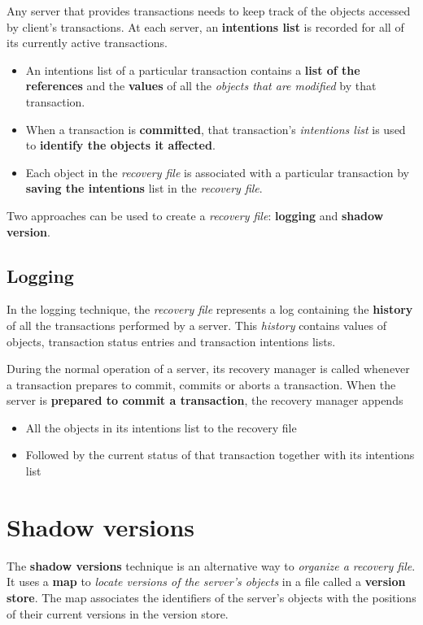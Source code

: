 Any server that provides transactions needs to keep track of the objects accessed by client's transactions. At each server, an \textbf{intentions list} is recorded for all of its currently active transactions.
\begin{itemize}
    \item An intentions list of a particular transaction contains a \textbf{list of the references} and the \textbf{values} of all the \textit{objects that are modified} by that transaction.
    \item When a transaction is \textbf{committed}, that transaction’s \textit{intentions list} is used to \textbf{identify the objects it affected}.
    \item Each object in the \textit{recovery file} is associated with a particular transaction by \textbf{saving the intentions} list in the \textit{recovery file}.
\end{itemize}
Two approaches can be used to create a \textit{recovery file}: \textbf{logging} and \textbf{shadow version}.

\subsection{Logging}
In the logging technique, the \textit{recovery file} represents a log containing the \textbf{history} of all the transactions performed by a server. This \textit{history} contains values of objects, transaction status entries and transaction intentions lists.

During the normal operation of a server, its recovery manager is called whenever a transaction prepares to commit, commits or aborts a transaction. When the server is \textbf{prepared to commit a transaction}, the recovery manager appends
\begin{itemize}
    \item All the objects in its intentions list to the recovery file
    \item Followed by the current status of that transaction together with its intentions list
\end{itemize}


\section{Shadow versions}
The \textbf{shadow versions} technique is an alternative way to \textit{organize a recovery file}. It uses a \textbf{map} to \textit{locate versions of the server’s objects} in a file called a \textbf{version store}. The map associates the identifiers of the server’s objects with the positions of their current versions in the version store.

